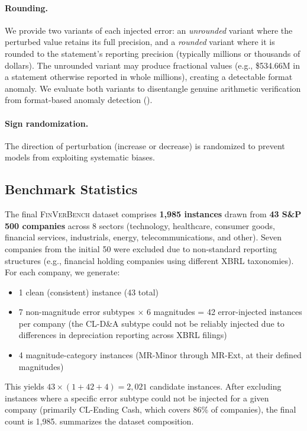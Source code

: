 \documentclass[11pt]{article}
\newcommand{\benchmark}{\textsc{FinVerBench}}
\begin{document}
\paragraph{Rounding.}
We provide two variants of each injected error: an \emph{unrounded} variant where the perturbed value retains its full precision, and a \emph{rounded} variant where it is rounded to the statement's reporting precision (typically millions or thousands of dollars).
The unrounded variant may produce fractional values (e.g., \$534.66M in a statement otherwise reported in whole millions), creating a detectable format anomaly.
We evaluate both variants to disentangle genuine arithmetic verification from format-based anomaly detection ().

\paragraph{Sign randomization.}
The direction of perturbation (increase or decrease) is randomized to prevent models from exploiting systematic biases.

\subsection{Benchmark Statistics}
\label{sec:stats}

The final \benchmark{} dataset comprises \textbf{1,985 instances} drawn from \textbf{43 S\&P 500 companies} across 8 sectors (technology, healthcare, consumer goods, financial services, industrials, energy, telecommunications, and other).
Seven companies from the initial 50 were excluded due to non-standard reporting structures (e.g., financial holding companies using different XBRL taxonomies).
For each company, we generate:
\begin{itemize}[topsep=2pt,itemsep=1pt]
    \item 1 clean (consistent) instance (43 total)
    \item 7 non-magnitude error subtypes $\times$ 6 magnitudes = 42 error-injected instances per company (the CL-D\&A subtype could not be reliably injected due to differences in depreciation reporting across XBRL filings)
    \item 4 magnitude-category instances (MR-Minor through MR-Ext, at their defined magnitudes)
\end{itemize}

\noindent This yields $43 \times (1 + 42 + 4) = 2{,}021$ candidate instances.
After excluding instances where a specific error subtype could not be injected for a given company (primarily CL-Ending Cash, which covers 86\% of companies), the final count is 1,985.
 summarizes the dataset composition.
\end{document}
